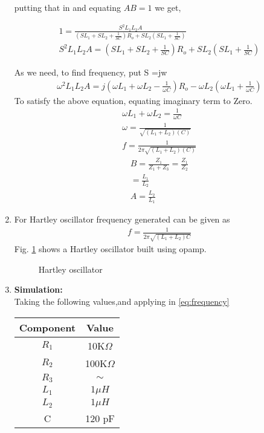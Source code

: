 \begin{enumerate}[label=\thesection.\arabic*.,ref=\thesection.\theenumi]
putting that in and equating $AB=1$ we get,

\begin{align}
1 = \frac{S^{2}L_1L_2A}{(SL_1+SL_2+\frac{1}{SC})R_o+ SL_2(SL_1+\frac{1}{SC})}\\
S^{2}L_1L_2A = (SL_1+SL_2+\frac{1}{SC})R_o+ SL_2(SL_1+\frac{1}{SC})
\end{align}

As we need, to find frequency, put S =jw
\begin{align}
    \omega^{2}L_1L_2A = j(\omega L_1 + \omega L_2 -\frac{1}{\omega C})R_o -\omega L_2(\omega L_1 + \frac{1}{\omega C})
\end{align}
To satisfy the above equation, equating imaginary term to Zero.
\begin{align}    
    \omega L_1 + \omega L_2  = \frac{1}{\omega C}\\
    \omega = \frac{1}{\sqrt{(L_1+L_2)(C)}}\\
    f = \frac{1}{2\pi \sqrt{(L_1+L_2)(C)}}
\end{align}
\begin{align}
    B = \frac{Z_1}{Z_1 + Z_3} = \frac{Z_1}{Z_2}\\
      = \frac{L_1}{L_2}\\
    A =  \frac{L_2}{L_1} 
\end{align}
 
\item For Hartley oscillator frequency generated can be given as 
\begin{align}
    f = \frac{1}{2\pi\sqrt{(L_1 + L_2)C}}
    \label{eq:frequency}
\end{align}
Fig. \ref{fig:ee18btech11019_hart} shows a
Hartley oscillator built using opamp.\\

\begin{figure}[ht]
    \begin{center}
	    \resizebox{\columnwidth}{!}{}
	\end{center}
\caption{Hartley oscillator}
\label{fig:ee18btech11019_hart}
\end{figure}


\item \textbf{Simulation:}\\
Taking the following values,and applying in \ref{eq:frequency} \\
\begin{table}[ht]
\centering
\begin{tabular}{|c|c|}
\hline
Component & Value  \\
\hline
$R_1$         & 10K$\Omega$   \\
\hline
$R_2$         & 100K$\Omega$   \\
\hline
$R_3$         & $\sim$  \\
\hline
$L_1$         & $1 \mu H$     \\
\hline
$L_2$         & $1 \mu H$   \\
\hline
C         & 120 pF \\
\hline
\end{tabular}
\end{table}


\end{enumerate}
